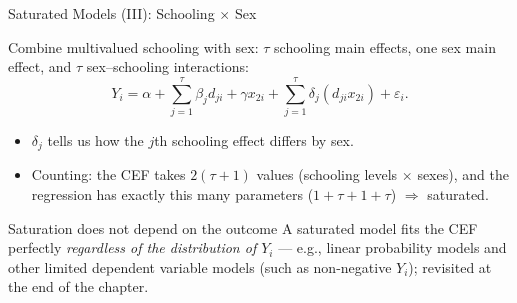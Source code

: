 \documentclass[aspectratio=169,11pt]{beamer}
\begin{document}
\begin{frame}{Saturated Models (III): Schooling $\times$ Sex}
\small

Combine multivalued schooling with sex: $\tau$ schooling main effects, one sex
main effect, and $\tau$ sex--schooling interactions:
\[
Y_i = \alpha+\sum_{j=1}^{\tau}\beta_jd_{ji}+\gamma x_{2i}
      +\sum_{j=1}^{\tau}\delta_j(d_{ji}x_{2i})+\varepsilon_i.
\tag{3.1.10}
\]

\begin{itemize}
    \item $\delta_j$ tells us how the $j$th schooling effect differs by sex.
    \item Counting: the CEF takes $2(\tau+1)$ values (schooling levels
    $\times$ sexes), and the regression has exactly this many parameters
    ($1+\tau+1+\tau$) $\Rightarrow$ saturated.
\end{itemize}

\medskip

\begin{alertblock}{Saturation does not depend on the outcome}
A saturated model fits the CEF perfectly \emph{regardless of the
distribution of $Y_i$} --- e.g., linear probability models and other limited
dependent variable models (such as non-negative $Y_i$); revisited at the end
of the chapter.
\end{alertblock}

\end{frame}
\end{document}
